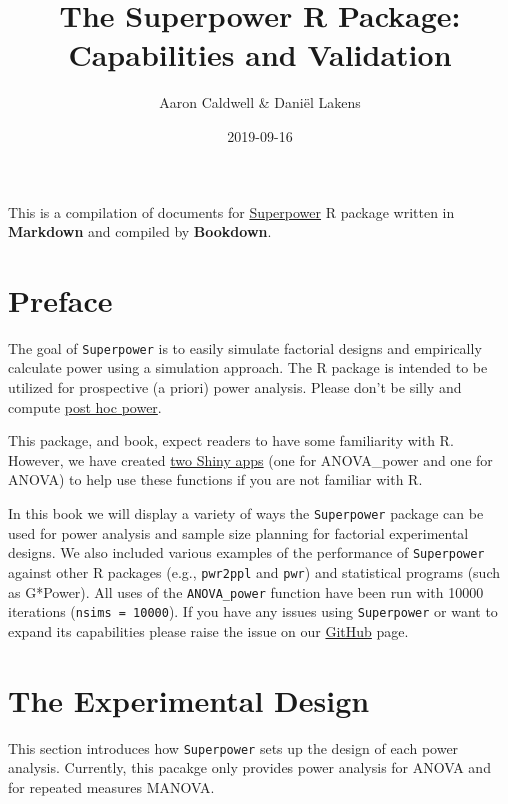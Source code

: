\documentclass[]{book}
\title{The Superpower R Package: Capabilities and Validation}
\author{Aaron Caldwell \& Daniël Lakens}
\date{2019-09-16}
\begin{document}
\maketitle

{
\setcounter{tocdepth}{1}
\tableofcontents
}
This is a compilation of documents for \href{https://github.com/arcaldwell49/Superpower}{Superpower} R package written in \textbf{Markdown} and compiled by \textbf{Bookdown}.

\hypertarget{preface}{%
\chapter*{Preface}\label{preface}}

The goal of \texttt{Superpower} is to easily simulate factorial designs and empirically calculate power using a simulation approach.
The R package is intended to be utilized for prospective (a priori) power analysis. Please don't be silly and compute \href{https://discourse.datamethods.org/t/reference-collection-to-push-back-against-common-statistical-myths/1787}{post hoc power}.

This package, and book, expect readers to have some familiarity with R. However, we have created \href{http://shiny.ieis.tue.nl/anova_power/}{two Shiny apps} (one for ANOVA\_power and one for ANOVA) to help use these functions if you are not familiar with R.

In this book we will display a variety of ways the \texttt{Superpower} package can be used for power analysis and sample size planning for factorial experimental designs. We also included various examples of the performance of \texttt{Superpower} against other R packages (e.g., \texttt{pwr2ppl} and \texttt{pwr}) and statistical programs (such as G*Power). All uses of the \texttt{ANOVA\_power} function have been run with 10000 iterations (\texttt{nsims\ =\ 10000}). If you have any issues using \texttt{Superpower} or want to expand its capabilities please raise the issue on our \href{https://github.com/arcaldwell49/Superpower/issues}{GitHub} page.

\hypertarget{the-experimental-design}{%
\chapter{The Experimental Design}\label{the-experimental-design}}

This section introduces how \texttt{Superpower} sets up the design of each power analysis.
Currently, this pacakge only provides power analysis for ANOVA and for repeated measures MANOVA.
\end{document}
